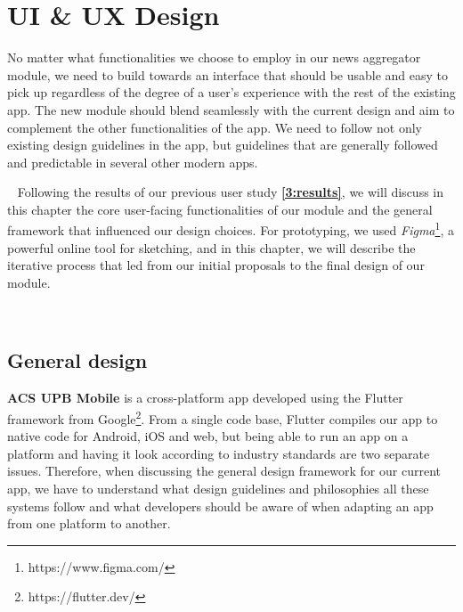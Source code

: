 \chapter{UI \& UX Design} \label{chapter4}

No matter what functionalities we choose to employ in our news aggregator module, we need to build towards an interface that should be usable and easy to pick up regardless of the degree of a user's experience with the rest of the existing app. The new module should blend seamlessly with the current design and aim to complement the other functionalities of the app. We need to follow not only existing design guidelines in the app, but guidelines that are generally followed and predictable in several other modern apps. 

~
Following the results of our previous user study \textbf{\ref{3:results}}, we will discuss in this chapter the core user-facing functionalities of our module and the general framework that influenced our design choices. For prototyping, we used \textit{Figma}\footnote{https://www.figma.com/}, a powerful online tool for sketching, and in this chapter, we will describe the iterative process that led from our initial proposals to the final design of our module.

~

\section{General design} \label{4:general_design}

\textbf{ACS UPB Mobile} is a cross-platform app developed using the Flutter framework from Google\footnote{https://flutter.dev/}. From a single code base, Flutter compiles our app to native code for Android, iOS and web, but being able to run an app on a platform and having it look according to industry standards are two separate issues. Therefore, when discussing the general design framework for our current app, we have to understand what design guidelines and philosophies all these systems follow and what developers should be aware of when adapting an app from one platform to another.

